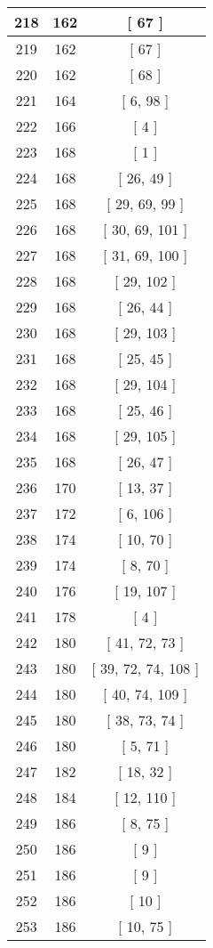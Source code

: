 \begin{center}
\begin{longtable}[H]{|| c c c ||}
\hline
218 & 162 & [ 67 ] \\ 
\hline
219 & 162 & [ 67 ] \\ 
\hline
220 & 162 & [ 68 ] \\ 
\hline
221 & 164 & [ 6, 98 ] \\ 
\hline
222 & 166 & [ 4 ] \\ 
\hline
223 & 168 & [ 1 ] \\ 
\hline
224 & 168 & [ 26, 49 ] \\ 
\hline
225 & 168 & [ 29, 69, 99 ] \\ 
\hline
226 & 168 & [ 30, 69, 101 ] \\ 
\hline
227 & 168 & [ 31, 69, 100 ] \\ 
\hline
228 & 168 & [ 29, 102 ] \\ 
\hline
229 & 168 & [ 26, 44 ] \\ 
\hline
230 & 168 & [ 29, 103 ] \\ 
\hline
231 & 168 & [ 25, 45 ] \\ 
\hline
232 & 168 & [ 29, 104 ] \\ 
\hline
233 & 168 & [ 25, 46 ] \\ 
\hline
234 & 168 & [ 29, 105 ] \\ 
\hline
235 & 168 & [ 26, 47 ] \\ 
\hline
236 & 170 & [ 13, 37 ] \\ 
\hline
237 & 172 & [ 6, 106 ] \\ 
\hline
238 & 174 & [ 10, 70 ] \\ 
\hline
239 & 174 & [ 8, 70 ] \\ 
\hline
240 & 176 & [ 19, 107 ] \\ 
\hline
241 & 178 & [ 4 ] \\ 
\hline
242 & 180 & [ 41, 72, 73 ] \\ 
\hline
243 & 180 & [ 39, 72, 74, 108 ] \\ 
\hline
244 & 180 & [ 40, 74, 109 ] \\ 
\hline
245 & 180 & [ 38, 73, 74 ] \\ 
\hline
246 & 180 & [ 5, 71 ] \\ 
\hline
247 & 182 & [ 18, 32 ] \\ 
\hline
248 & 184 & [ 12, 110 ] \\ 
\hline
249 & 186 & [ 8, 75 ] \\ 
\hline
250 & 186 & [ 9 ] \\ 
\hline
251 & 186 & [ 9 ] \\ 
\hline
252 & 186 & [ 10 ] \\ 
\hline
253 & 186 & [ 10, 75 ] \\ 

\end{longtable}
\end{center}
